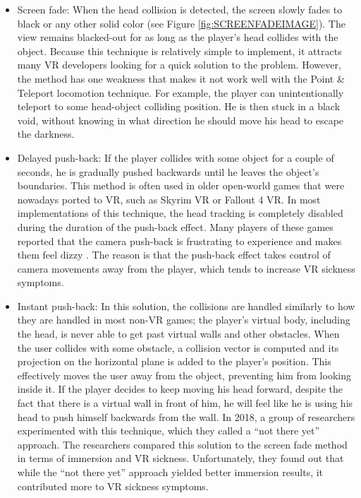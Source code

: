 \begin{itemize}
\item Screen fade: When the head collision is detected, the screen slowly fades to black or any other solid color (see Figure \ref{fig:SCREENFADEIMAGE}). The view remains blacked-out for as long as the player's head collides with the object. Because this technique is relatively simple to implement, it attracts many VR developers looking for a quick solution to the problem. However, the method has one weakness that makes it not work well with the Point \& Teleport locomotion technique. For example, the player can unintentionally teleport to some head-object colliding position. He is then stuck in a black void, without knowing in what direction he should move his head to escape the darkness.

\item Delayed push-back: If the player collides with some object for a couple of seconds, he is gradually pushed backwards until he leaves the object's boundaries. This method is often used in older open-world games that were nowadays ported to VR, such as Skyrim VR or Fallout 4 VR. In most implementations of this technique, the head tracking is completely disabled during the duration of the push-back effect. Many players of these games reported that the camera push-back is frustrating to experience and makes them feel dizzy \cite{redditfallout}\cite{SKYRIMVRPUSHBACK}\cite{PUSHBACKFEEDBACK}. The reason is that the push-back effect takes control of camera movements away from the player, which tends to increase VR sickness symptoms.

\item Instant push-back: In this solution, the collisions are handled similarly to how they are handled in most non-VR games; the player's virtual body, including the head, is never able to get past virtual walls and other obstacles. When the user collides with some obstacle, a collision vector is computed and its projection on the horizontal plane is added to the player's position. This effectively moves the user away from the object, preventing him from looking inside it. If the player decides to keep moving his head forward, despite the fact that there is a virtual wall in front of him, he will feel like he is using his head to push himself backwards from the wall. In 2018, a group of researchers \cite{COMPARISONCOLLISION} experimented with this technique, which they called a ``not there yet'' approach. The researchers compared this solution to the screen fade method in terms of immersion and VR sickness. Unfortunately, they found out that while the ``not there yet'' approach yielded better immersion results, it contributed more to VR sickness symptoms.


\end{itemize}
